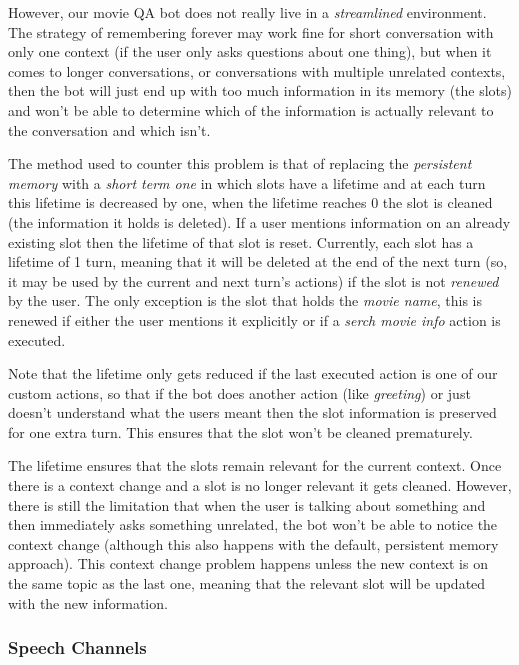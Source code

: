 \documentclass[11pt,a4paper]{article}
\begin{document}
			However, our movie QA bot does not really live in a \textit{streamlined} environment. The strategy of remembering forever may work fine for short conversation with only one context (if the user only asks questions about one thing), but when it comes to longer conversations, or conversations with multiple unrelated contexts, then the bot will just end up with too much information in its memory (the slots) and won't be able to determine which of the information is actually relevant to the conversation and which isn't.
			
			The method used to counter this problem is that of replacing the \textit{persistent memory} with a \textit{short term one} in which slots have a lifetime and at each turn this lifetime is decreased by one, when the lifetime reaches 0 the slot is cleaned (the information it holds is deleted). If a user mentions information on an already existing slot then the lifetime of that slot is reset. Currently, each slot has a lifetime of 1 turn, meaning that it will be deleted at the end of the next turn (so, it may be used by the current and next turn's actions) if the slot is not \textit{renewed} by the user. The only exception is the slot that holds the \textit{movie name}, this is renewed if either the user mentions it explicitly or if a \textit{serch movie info} action is executed. 
			
			Note that the lifetime only gets reduced if the last executed action is one of our custom actions, so that if the bot does another action (like \textit{greeting}) or just doesn't understand what the users meant then the slot information is preserved for one extra turn. This ensures that the slot won't be cleaned prematurely.
			
			The lifetime ensures that the slots remain relevant for the current context. Once there is a context change and a slot is no longer relevant it gets cleaned. However, there is still the limitation that when the user is talking about something and then immediately asks something unrelated, the bot won't be able to notice the context change (although this also happens with the default, persistent memory approach). This context change problem happens unless the new context is on the same topic as the last one, meaning that the relevant slot will be updated with the new information.
			
		\subsubsection{Speech Channels}
		\label{sec-speech}
		
\end{document}
